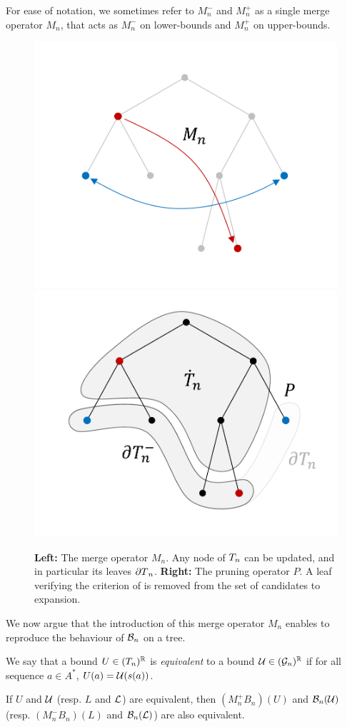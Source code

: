 \documentclass[runningheads]{llncs}
\begin{document}
\begin{remark} For ease of notation, we sometimes refer to $M_n^-$ and $M_n^+$ as a single merge operator $M_n$, that acts as $M_n^-$ on lower-bounds and $M_n^+$ on upper-bounds.
\end{remark}

\begin{figure}[th]
	\centering
	\includegraphics[trim={1.8cm 1.4cm 1.1cm 1.1cm}, clip,width=0.42\linewidth]{img/tree_3}
	\qquad
	\includegraphics[trim={1.8cm 1.4cm 1.1cm 1.1cm}, clip, width=0.42\linewidth]{img/tree_4}
	\caption{\textbf{Left:} The merge operator $M_n$. Any node of $T_n$ can be updated, and in particular its leaves ${\partial T}_n$. \textbf{Right:} The pruning operator $P$. A leaf verifying the criterion of  is removed from the set of candidates to expansion.}
	\label{fig:operators}
\end{figure}

We now argue that the introduction of this merge operator $M_n$ enables to reproduce the behaviour of $\mathcal{B}_n$ on a tree.

\begin{definition}
	We say that a bound $U\in (T_n)^{\mathbb{R}}$ is \emph{equivalent} to a bound $\mathcal{U} \in (\mathcal{G}_n) ^{\mathbb{R}} $ if for all sequence $a\in A^*$, $U(a) = \mathcal{U}(s(a))$.
\end{definition}

\begin{proposition}[``$\cB = MB$"]
	\label{prop:b-eq-mb}
	If $U$ and $\mathcal{U}$ (resp. $L$ and $\mathcal{L}$) are equivalent, then $(M_n^+B_n)(U)$ and $\mathcal{B}_n(\mathcal{U})$ (resp. $(M_n^-B_n)(L)$ and $\mathcal{B}_n(\mathcal{L})$) are also equivalent.
\end{proposition}
\end{document}

